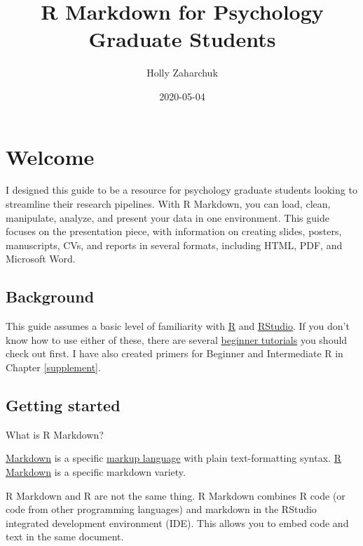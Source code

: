 \documentclass[
  openany]{book}
\title{R Markdown for Psychology Graduate Students}
\author{Holly Zaharchuk}
\date{2020-05-04}
\begin{document}
\maketitle

{
\setcounter{tocdepth}{1}
\tableofcontents
}
\hypertarget{welcome}{%
\chapter{Welcome}\label{welcome}}

I designed this guide to be a resource for psychology graduate students looking to streamline their research pipelines. With R Markdown, you can load, clean, manipulate, analyze, and present your data in one environment. This guide focuses on the presentation piece, with information on creating slides, posters, manuscripts, CVs, and reports in several formats, including HTML, PDF, and Microsoft Word.

\hypertarget{background}{%
\section{Background}\label{background}}

This guide assumes a basic level of familiarity with \href{https://www.r-project.org/}{R} and \href{https://rstudio.com/products/rstudio/download/}{RStudio}. If you don't know how to use either of these, there are several \href{https://education.rstudio.com/learn/beginner/}{beginner tutorials} you should check out first. I have also created primers for Beginner and Intermediate R in Chapter \ref{supplement}.

\hypertarget{getting-started}{%
\section{Getting started}\label{getting-started}}

What is R Markdown?

\href{https://en.wikipedia.org/wiki/Markdown}{Markdown} is a specific \href{https://en.wikipedia.org/wiki/Markup_language}{markup language} with plain text-formatting syntax. \href{https://cran.r-project.org/web/packages/stationery/vignettes/Rmarkdown.pdf}{R Markdown} is a specific markdown variety.

R Markdown and R are not the same thing. R Markdown combines R code (or code from other programming languages) and markdown in the RStudio integrated development environment (IDE). This allows you to embed code and text in the same document.
\end{document}
